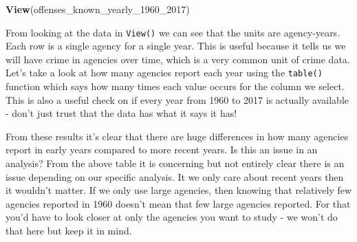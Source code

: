 \documentclass[
  12pt,
]{book}
\newenvironment{Shaded}{\begin{snugshade}}{\end{snugshade}}
\newcommand{\CommentTok}[1]{\textcolor[rgb]{0.37,0.37,0.37}{\textit{#1}}}
\newcommand{\DecValTok}[1]{\textcolor[rgb]{0.06,0.06,0.06}{#1}}
\newcommand{\KeywordTok}[1]{\textcolor[rgb]{0.27,0.27,0.27}{\textbf{#1}}}
\newcommand{\NormalTok}[1]{#1}
\newcommand{\OperatorTok}[1]{\textcolor[rgb]{0.43,0.43,0.43}{\textbf{#1}}}
\begin{document}
\begin{Shaded}
\begin{Highlighting}[]
\KeywordTok{View}\NormalTok{(offenses\_known\_yearly\_}\DecValTok{1960}\NormalTok{\_}\DecValTok{2017}\NormalTok{)}
\end{Highlighting}
\end{Shaded}

From looking at the data in \texttt{View()} we can see that the units are agency-years. Each row is a single agency for a single year. This is useful because it tells us we will have crime in agencies over time, which is a very common unit of crime data. Let's take a look at how many agencies report each year using the \texttt{table()} function which says how many times each value occurs for the column we select. This is also a useful check on if every year from 1960 to 2017 is actually available - don't just trust that the data has what it says it has!

\begin{Shaded}
\end{Shaded}

From these results it's clear that there are huge differences in how many agencies report in early years compared to more recent years. Is this an issue in an analysis? From the above table it is concerning but not entirely clear there is an issue depending on our specific analysis. It we only care about recent years then it wouldn't matter. If we only use large agencies, then knowing that relatively few agencies reported in 1960 doesn't mean that few large agencies reported. For that you'd have to look closer at only the agencies you want to study - we won't do that here but keep it in mind.
\end{document}
